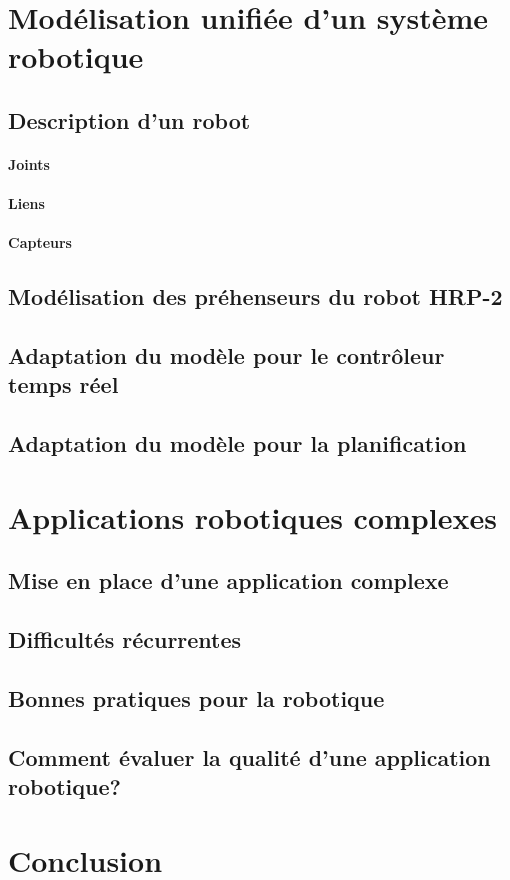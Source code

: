 \section{Modélisation unifiée d'un système robotique}
\subsection{Description d'un robot}
\paragraph{Joints}
\paragraph{Liens}
\paragraph{Capteurs}

\subsection{Modélisation des préhenseurs du robot HRP-2}
\subsection{Adaptation du modèle pour le contrôleur temps réel}
\subsection{Adaptation du modèle pour la planification}

\section{Applications robotiques complexes}
\subsection{Mise en place d'une application complexe}
\subsection{Difficultés récurrentes}
\subsection{Bonnes pratiques pour la robotique}
\subsection{Comment évaluer la qualité d'une application robotique?}


\section{Conclusion}


